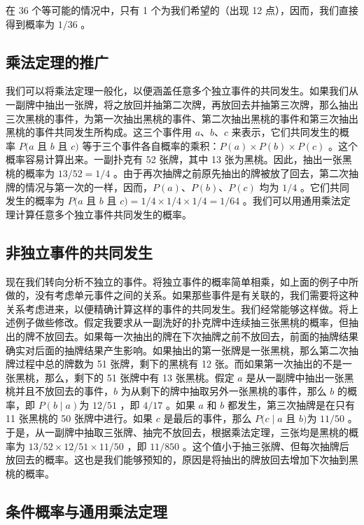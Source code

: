 在 36 个等可能的情况中，只有 1 个为我们希望的（出现 12 点），因而，我们直接得到概率为 $1 / 36$ 。

\subsection{乘法定理的推广}

我们可以将乘法定理一般化，以便涵盖任意多个独立事件的共同发生。如果我们从一副牌中抽出一张牌，将之放回并抽第二次牌，再放回去并抽第三次牌，那么抽出三次黑桃的事件，为第一次抽出黑桃的事件、第二次抽出黑桃的事件和第三次抽出黑桃的事件共同发生所构成。这三个事件用 $a$、$b$、$c$ 来表示，它们共同发生的概率 $P(a$ 且 $b$ 且 $c)$ 等于三个事件各自概率的乘积：$P(a) \times P(b) \times P(c)$ 。这个概率容易计算出来。一副扑克有 52 张牌，其中 13 张为黑桃。因此，抽出一张黑桃的概率为 $13 / 52=1 / 4$ 。由于再次抽牌之前原先抽出的牌被放了回去，第二次抽牌的情况与第一次的一样，因而，$P(a)$、$P(b)$、$P(c)$ 均为 $1 / 4$ 。它们共同发生的概率为 $P(a$ 且 $b$ 且 $c)=1 / 4 \times 1 / 4 \times 1 / 4=1 / 64$ 。我们可以用通用乘法定理计算任意多个独立事件共同发生的概率。

\subsection{非独立事件的共同发生}

现在我们转向分析不独立的事件。将独立事件的概率简单相乘，如上面的例子中所做的，没有考虑单元事件之间的关系。如果那些事件是有关联的，我们需要将这种关系考虑进来，以便精确计算这样的事件的共同发生。我们经常能够这样做。将上述例子做些修改。假定我要求从一副洗好的扑克牌中连续抽三张黑桃的概率，但抽出的牌不放回去。如果每一次抽出的牌在下次抽牌之前不放回去，前面的抽牌结果确实对后面的抽牌结果产生影响。如果抽出的第一张牌是一张黑桃，那么第二次抽牌过程中总的牌数为 51 张牌，剩下的黑桃有 12 张。而如果第一次抽出的不是一张黑桃，那么，剩下的 51 张牌中有 13 张黑桃。假定 $a$ 是从一副牌中抽出一张黑桃并且不放回去的事件，$b$ 为从剩下的牌中抽取另外一张黑桃的事件，那么 $b$ 的概率，即 $P(b \mid a)$为 $12 / 51$ ，即 $4 / 17$ 。如果 $a$ 和 $b$ 都发生，第三次抽牌是在只有 11 张黑桃的 50 张牌中进行。如果 $c$ 是最后的事件，那么 $P(c \mid a$ 且 $b)$为 $11 / 50$ 。于是，从一副牌中抽取三张牌、抽完不放回去，根据乘法定理，三张均是黑桃的概率为 $13 / 52 \times 12 / 51 \times 11 / 50$ ，即 $11 / 850$ 。这个值小于抽三张牌、但每次抽牌后放回去的概率。这也是我们能够预知的，原因是将抽出的牌放回去增加下次抽到黑桃的概率。

\subsection{条件概率与通用乘法定理}

